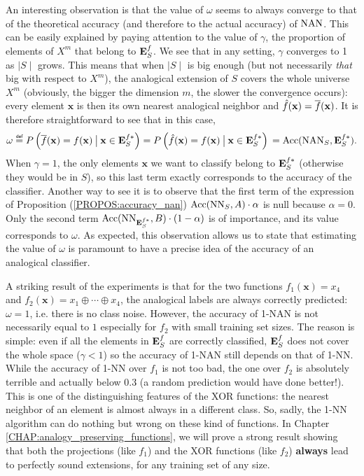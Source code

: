 An interesting observation is that the value of $\omega$ seems to always
converge to that of the theoretical accuracy (and therefore to the actual
accuracy) of $\mbox{NAN}$. This can be easily explained by paying attention to the
value of $\gamma$, the proportion of elements of $X^m$ that belong to $\mathbf{E}_{S}^{f}$.
We see that in any setting, $\gamma$ converges to 1 as $\mid S \mid$ grows.
This means that when $\mid S \mid$ is big enough (but not necessarily
\textit{that} big with respect to $X^m$), the analogical extension of $S$
covers the whole universe $X^m$ (obviously, the bigger the dimension $m$, the
slower the convergence occurs): every element $\mathbf{x}$ is then its own
nearest analogical neighbor and $\hat{f}(\mathbf{x}) = \overline{f}(\mathbf{x})$. It
is therefore straightforward to see that in this case,
$$
  \omega \eqdef P\left(\albl{\mathbf{x}} = f(\mathbf{x}) \given[\big]
  \mathbf{x} \in \esfs\right) = P\left(\hat{f}(\mathbf{x}) = f(\mathbf{x})
  \given[\big] \mathbf{x} \in \esfs\right)\\ = \acc(\NAN_S, \esfs).
$$
When $\gamma = 1$, the only elements $\mathbf{x}$ we want to classify belong to
$\mathbf{E}_{S}^{f*}$ (otherwise they would be in $S$), so this last term exactly corresponds
to the accuracy of the classifier. Another way to see it is to observe that the
first term of the expression of Proposition (\ref{PROPOS:accuracy_nan})
$\mbox{Acc}(\text{NN}_{S}, A) \cdot \alpha$ is null 
because $\alpha = 0$. Only the second term $\mbox{Acc}(\text{NN}_{\mathbf{E}_{S}^{f*}}, B) \cdot (1 -
\alpha)$ is of importance, and its value corresponds to $\omega$. As expected,
this observation allows us to state that estimating the value of $\omega$ is
paramount to have a precise idea of the accuracy of an analogical classifier.

A striking result of the experiments is that for the two functions
$f_1(\mathbf{x}) = x_4$ and $f_2(\mathbf{x}) = x_1 \oplus \cdots \oplus x_4$,
the analogical labels are always correctly predicted: $\omega = 1$, i.e. there
is no class noise. However, the accuracy of 1-NAN is not necessarily equal to
$1$ especially for $f_2$ with small training set sizes. The reason is simple:
even if all the elements in $\mathbf{E}_{S}^{f}$ are correctly classified, $\mathbf{E}_{S}^{f}$ does not
cover the whole space ($\gamma < 1$) so the accuracy of 1-NAN still depends on
that of 1-NN. While the accuracy of 1-NN over $f_1$ is not too bad, the one
over $f_2$ is absolutely terrible and actually below $0.3$ (a random prediction
would have done better!). This is one of the distinguishing features of the XOR
functions: the nearest neighbor of an element is almost always in a different
class. So, sadly, the 1-NN algorithm can do nothing but wrong on these kind of
functions. In Chapter \ref{CHAP:analogy_preserving_functions}, we will prove a
strong result showing that both the projections (like $f_1$) and the XOR
functions (like $f_2$) \textbf{always} lead to perfectly sound extensions, for
any training set of any size.

